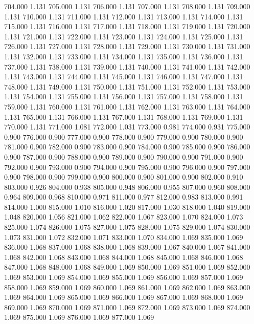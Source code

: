 704.000 1.131 
705.000 1.131 
706.000 1.131 
707.000 1.131 
708.000 1.131 
709.000 1.131 
710.000 1.131 
711.000 1.131 
712.000 1.131 
713.000 1.131 
714.000 1.131 
715.000 1.131 
716.000 1.131 
717.000 1.131 
718.000 1.131 
719.000 1.131 
720.000 1.131 
721.000 1.131 
722.000 1.131 
723.000 1.131 
724.000 1.131 
725.000 1.131 
726.000 1.131 
727.000 1.131 
728.000 1.131 
729.000 1.131 
730.000 1.131 
731.000 1.131 
732.000 1.131 
733.000 1.131 
734.000 1.131 
735.000 1.131 
736.000 1.131 
737.000 1.131 
738.000 1.131 
739.000 1.131 
740.000 1.131 
741.000 1.131 
742.000 1.131 
743.000 1.131 
744.000 1.131 
745.000 1.131 
746.000 1.131 
747.000 1.131 
748.000 1.131 
749.000 1.131 
750.000 1.131 
751.000 1.131 
752.000 1.131 
753.000 1.131 
754.000 1.131 
755.000 1.131 
756.000 1.131 
757.000 1.131 
758.000 1.131 
759.000 1.131 
760.000 1.131 
761.000 1.131 
762.000 1.131 
763.000 1.131 
764.000 1.131 
765.000 1.131 
766.000 1.131 
767.000 1.131 
768.000 1.131 
769.000 1.131 
770.000 1.131 
771.000 1.081 
772.000 1.031 
773.000 0.981 
774.000 0.931 
775.000 0.900 
776.000 0.900 
777.000 0.900 
778.000 0.900 
779.000 0.900 
780.000 0.900 
781.000 0.900 
782.000 0.900 
783.000 0.900 
784.000 0.900 
785.000 0.900 
786.000 0.900 
787.000 0.900 
788.000 0.900 
789.000 0.900 
790.000 0.900 
791.000 0.900 
792.000 0.900 
793.000 0.900 
794.000 0.900 
795.000 0.900 
796.000 0.900 
797.000 0.900 
798.000 0.900 
799.000 0.900 
800.000 0.900 
801.000 0.900 
802.000 0.910 
803.000 0.926 
804.000 0.938 
805.000 0.948 
806.000 0.955 
807.000 0.960 
808.000 0.964 
809.000 0.968 
810.000 0.971 
811.000 0.977 
812.000 0.983 
813.000 0.991 
814.000 1.000 
815.000 1.010 
816.000 1.020 
817.000 1.030 
818.000 1.040 
819.000 1.048 
820.000 1.056 
821.000 1.062 
822.000 1.067 
823.000 1.070 
824.000 1.073 
825.000 1.074 
826.000 1.075 
827.000 1.075 
828.000 1.075 
829.000 1.074 
830.000 1.073 
831.000 1.072 
832.000 1.071 
833.000 1.070 
834.000 1.069 
835.000 1.069 
836.000 1.068 
837.000 1.068 
838.000 1.068 
839.000 1.067 
840.000 1.067 
841.000 1.068 
842.000 1.068 
843.000 1.068 
844.000 1.068 
845.000 1.068 
846.000 1.068 
847.000 1.068 
848.000 1.068 
849.000 1.069 
850.000 1.069 
851.000 1.069 
852.000 1.069 
853.000 1.069 
854.000 1.069 
855.000 1.069 
856.000 1.069 
857.000 1.069 
858.000 1.069 
859.000 1.069 
860.000 1.069 
861.000 1.069 
862.000 1.069 
863.000 1.069 
864.000 1.069 
865.000 1.069 
866.000 1.069 
867.000 1.069 
868.000 1.069 
869.000 1.069 
870.000 1.069 
871.000 1.069 
872.000 1.069 
873.000 1.069 
874.000 1.069 
875.000 1.069 
876.000 1.069 
877.000 1.069 
